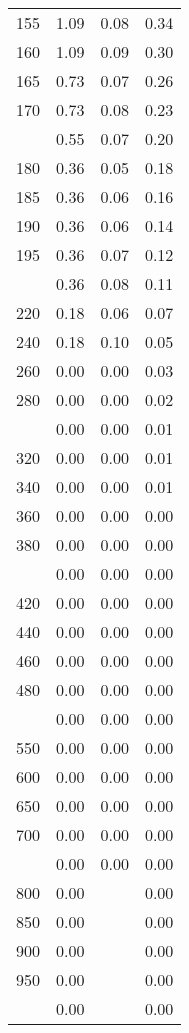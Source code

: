 \begin{table}[ht]
\begin{tabular}{lccc}
  155 & 1.09 & 0.08 & 0.34 \\ 
  160 & 1.09 & 0.09 & 0.30 \\ 
  165 & 0.73 & 0.07 & 0.26 \\ 
  170 & 0.73 & 0.08 & 0.23 \\ 
   \addlinespace
175 & 0.55 & 0.07 & 0.20 \\ 
  180 & 0.36 & 0.05 & 0.18 \\ 
  185 & 0.36 & 0.06 & 0.16 \\ 
  190 & 0.36 & 0.06 & 0.14 \\ 
  195 & 0.36 & 0.07 & 0.12 \\ 
   \addlinespace
200 & 0.36 & 0.08 & 0.11 \\ 
  220 & 0.18 & 0.06 & 0.07 \\ 
  240 & 0.18 & 0.10 & 0.05 \\ 
  260 & 0.00 & 0.00 & 0.03 \\ 
  280 & 0.00 & 0.00 & 0.02 \\ 
   \addlinespace
300 & 0.00 & 0.00 & 0.01 \\ 
  320 & 0.00 & 0.00 & 0.01 \\ 
  340 & 0.00 & 0.00 & 0.01 \\ 
  360 & 0.00 & 0.00 & 0.00 \\ 
  380 & 0.00 & 0.00 & 0.00 \\ 
   \addlinespace
400 & 0.00 & 0.00 & 0.00 \\ 
  420 & 0.00 & 0.00 & 0.00 \\ 
  440 & 0.00 & 0.00 & 0.00 \\ 
  460 & 0.00 & 0.00 & 0.00 \\ 
  480 & 0.00 & 0.00 & 0.00 \\ 
   \addlinespace
500 & 0.00 & 0.00 & 0.00 \\ 
  550 & 0.00 & 0.00 & 0.00 \\ 
  600 & 0.00 & 0.00 & 0.00 \\ 
  650 & 0.00 & 0.00 & 0.00 \\ 
  700 & 0.00 & 0.00 & 0.00 \\ 
   \addlinespace
750 & 0.00 & 0.00 & 0.00 \\ 
  800 & 0.00 &  & 0.00 \\ 
  850 & 0.00 &  & 0.00 \\ 
  900 & 0.00 &  & 0.00 \\ 
  950 & 0.00 &  & 0.00 \\ 
   \addlinespace
1000 & 0.00 &  & 0.00 \\ 
   \bottomrule
\end{tabular}
\end{table}
